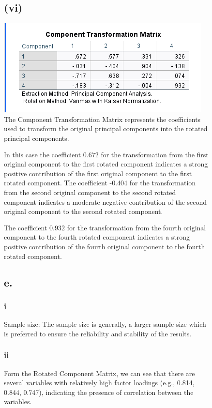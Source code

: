 \documentclass[english,10pt,a4paper]{article}
\begin{document}
\begin{figure}
	\subsection*{(vi)}
	\includegraphics[width=1\linewidth]{component tranformation matrix.png}
The Component Transformation Matrix represents the coefficients used to transform the original principal components into the rotated principal components. 	

In  this case the coefficient 0.672 for the transformation from the first original component to the first rotated component indicates a strong positive contribution of the first original component to the first rotated component.
The coefficient -0.404 for the transformation from the second original component to the second rotated component indicates a moderate negative contribution of the second original component to the second rotated component.

The coefficient 0.932 for the transformation from the fourth original component to the fourth rotated component indicates a strong positive contribution of the fourth original component to the fourth rotated component.
	
	
	\subsection*{e.}
	
	\subsubsection*{i}Sample size:
	The sample size is generally, a larger sample size which is preferred to ensure the reliability and stability of the results.
\subsubsection*{ii}	
Form the Rotated Component Matrix, we can see that there are several variables with relatively high factor loadings (e.g., 0.814, 0.844, 0.747), indicating the presence of correlation between the variables.


\end{figure}
\end{document}
